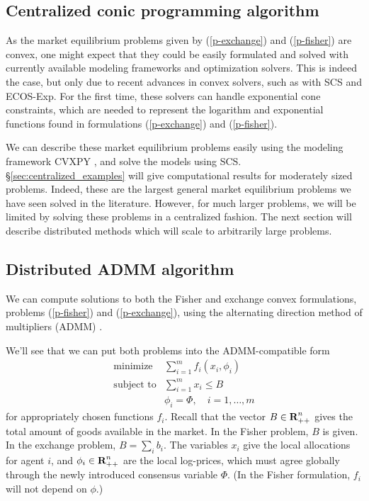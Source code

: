 \documentclass[12pt]{article}
\begin{document}
\label{sec:algorithms}
\subsection{Centralized conic programming algorithm}
\label{sec:centralized}

As the market equilibrium problems given by (\ref{p-exchange}) and
(\ref{p-fisher}) are convex, one might expect that they could be easily
formulated and solved with currently available modeling frameworks and
optimization solvers. This is indeed the case, but only due to recent advances
in convex solvers, such as with SCS \cite{scs} and ECOS-Exp. %
For the first time, these solvers can handle exponential cone constraints,
which are needed to represent the logarithm and exponential functions found in
formulations (\ref{p-exchange}) and (\ref{p-fisher}).

We can describe these market equilibrium problems easily using the modeling
framework CVXPY \cite{cvxpy}, and solve the models using SCS.
\S\ref{sec:centralized_examples} will give computational results for moderately
sized problems. Indeed, these are the largest general market equilibrium
problems we have seen solved in the literature. However, for much larger
problems, we will be limited by solving these problems in a centralized
fashion. The next section will describe distributed methods which will scale to
arbitrarily large problems.


\subsection{Distributed ADMM algorithm}
\label{sec:distributed}

We can compute solutions to both the Fisher and
exchange convex formulations, problems (\ref{p-fisher}) and (\ref{p-exchange}),
using the alternating direction method of multipliers (ADMM)
\cite{boyd2011distributed, parikh2013proximal}.

We'll see that we can put both problems into the ADMM-compatible form
\begin{equation}
\label{p-admm}
\begin{array}{ll}
\mbox{minimize} & \sum_{i=1}^m f_i(x_i, \phi_i) \\
\mbox{subject to} & \sum_{i=1}^m x_i \leq B\\
& \phi_i = \Phi, \quad i=1,\ldots,m
\end{array}
\end{equation}
for appropriately chosen functions $f_i$. Recall that the vector $B \in
{\mbox{\bf R}}^n_{++}$ gives the total amount of goods available in the market. In the
Fisher problem, $B$ is given. In the exchange problem, $B = \sum_i b_i$. The
variables $x_i$ give the local allocations for agent $i$, and $\phi_i \in
{\mbox{\bf R}}^n_{++}$ are the local log-prices, which must agree globally through the
newly introduced consensus variable $\Phi$. (In the Fisher formulation, $f_i$
will not depend on $\phi$.)
\end{document}
